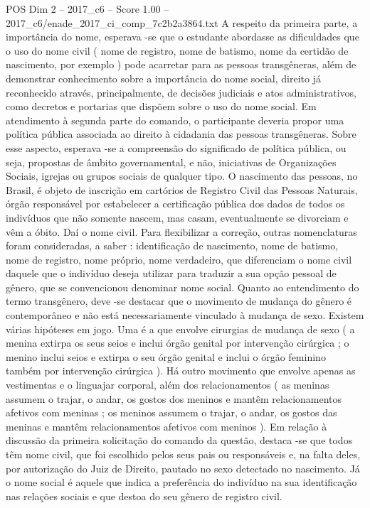 \begin{textsample}{POS Dim 2 – 2017\_c6 – Score 1.00 – 2017\_c6/enade\_2017\_ci\_comp\_7c2b2a3864.txt}
A respeito da primeira parte, a importância do nome, esperava -se que o estudante abordasse as dificuldades que o uso do nome civil ( nome de registro, nome de batismo, nome da certidão de nascimento, por exemplo ) pode acarretar para as pessoas transgêneras, além de demonstrar conhecimento sobre a importância do nome social, direito já reconhecido através, principalmente, de decisões judiciais e atos administrativos, como decretos e portarias que dispõem sobre o uso do nome social.
Em atendimento à segunda parte do comando, o participante deveria propor uma política pública associada ao direito à cidadania das pessoas transgêneras.
Sobre esse aspecto, esperava -se a compreensão do significado de política pública, ou seja, propostas de âmbito governamental, e não, iniciativas de Organizações Sociais, igrejas ou grupos sociais de qualquer tipo.
O nascimento das pessoas, no Brasil, é objeto de inscrição em cartórios de Registro Civil das Pessoas Naturais, órgão responsável por estabelecer a certificação pública dos dados de todos os indivíduos que não somente nascem, mas casam, eventualmente se divorciam e vêm a óbito.
Daí o nome civil.
Para flexibilizar a correção, outras nomenclaturas foram consideradas, a saber : identificação de nascimento, nome de batismo, nome de registro, nome próprio, nome verdadeiro, que diferenciam o nome civil daquele que o indivíduo deseja utilizar para traduzir a sua opção pessoal de gênero, que se convencionou denominar nome social.
Quanto ao entendimento do termo transgênero, deve -se destacar que o movimento de mudança do gênero é contemporâneo e não está necessariamente vinculado à mudança de sexo.
Existem várias hipóteses em jogo.
Uma é a que envolve cirurgias de mudança de sexo ( a menina extirpa os seus seios e inclui órgão genital por intervenção cirúrgica ; o menino inclui seios e extirpa o seu órgão genital e inclui o órgão feminino também por intervenção cirúrgica ).
Há outro movimento que envolve apenas as vestimentas e o linguajar corporal, além dos relacionamentos ( as meninas assumem o trajar, o andar, os gostos dos meninos e mantêm relacionamentos afetivos com meninas ; os meninos assumem o trajar, o andar, os gostos das meninas e mantêm relacionamentos afetivos com meninos ).
Em relação à discussão da primeira solicitação do comando da questão, destaca -se que todos têm nome civil, que foi escolhido pelos seus pais ou responsáveis e, na falta deles, por autorização do Juiz de Direito, pautado no sexo detectado no nascimento.
Já o nome social é aquele que indica a preferência do indivíduo na sua identificação nas relações sociais e que destoa do seu gênero de registro civil.

\end{textsample}
